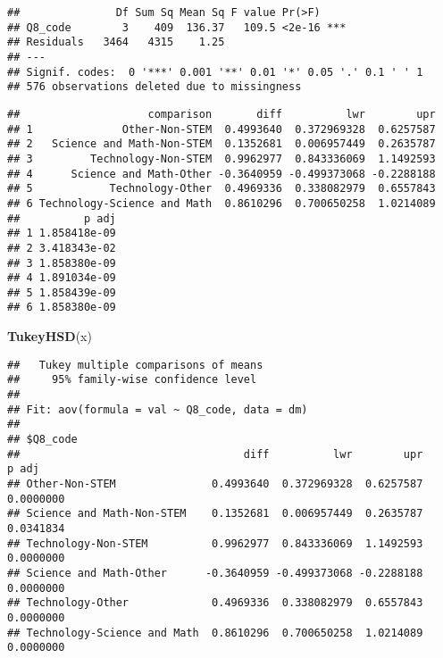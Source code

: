 \documentclass[]{article}
\newenvironment{Shaded}{\begin{snugshade}}{\end{snugshade}}
\newcommand{\KeywordTok}[1]{\textcolor[rgb]{0.13,0.29,0.53}{\textbf{#1}}}
\newcommand{\DecValTok}[1]{\textcolor[rgb]{0.00,0.00,0.81}{#1}}
\newcommand{\StringTok}[1]{\textcolor[rgb]{0.31,0.60,0.02}{#1}}
\newcommand{\OperatorTok}[1]{\textcolor[rgb]{0.81,0.36,0.00}{\textbf{#1}}}
\newcommand{\NormalTok}[1]{#1}
\begin{document}
\begin{verbatim}
##               Df Sum Sq Mean Sq F value Pr(>F)    
## Q8_code        3    409  136.37   109.5 <2e-16 ***
## Residuals   3464   4315    1.25                   
## ---
## Signif. codes:  0 '***' 0.001 '**' 0.01 '*' 0.05 '.' 0.1 ' ' 1
## 576 observations deleted due to missingness
\end{verbatim}

\begin{Shaded}
\end{Shaded}

\begin{verbatim}
##                    comparison       diff          lwr        upr
## 1              Other-Non-STEM  0.4993640  0.372969328  0.6257587
## 2   Science and Math-Non-STEM  0.1352681  0.006957449  0.2635787
## 3         Technology-Non-STEM  0.9962977  0.843336069  1.1492593
## 4      Science and Math-Other -0.3640959 -0.499373068 -0.2288188
## 5            Technology-Other  0.4969336  0.338082979  0.6557843
## 6 Technology-Science and Math  0.8610296  0.700650258  1.0214089
##          p adj
## 1 1.858418e-09
## 2 3.418343e-02
## 3 1.858380e-09
## 4 1.891034e-09
## 5 1.858439e-09
## 6 1.858380e-09
\end{verbatim}

\begin{Shaded}
\begin{Highlighting}[]
\KeywordTok{TukeyHSD}\NormalTok{(x)}
\end{Highlighting}
\end{Shaded}

\begin{verbatim}
##   Tukey multiple comparisons of means
##     95% family-wise confidence level
## 
## Fit: aov(formula = val ~ Q8_code, data = dm)
## 
## $Q8_code
##                                   diff          lwr        upr     p adj
## Other-Non-STEM               0.4993640  0.372969328  0.6257587 0.0000000
## Science and Math-Non-STEM    0.1352681  0.006957449  0.2635787 0.0341834
## Technology-Non-STEM          0.9962977  0.843336069  1.1492593 0.0000000
## Science and Math-Other      -0.3640959 -0.499373068 -0.2288188 0.0000000
## Technology-Other             0.4969336  0.338082979  0.6557843 0.0000000
## Technology-Science and Math  0.8610296  0.700650258  1.0214089 0.0000000
\end{verbatim}
\end{document}
